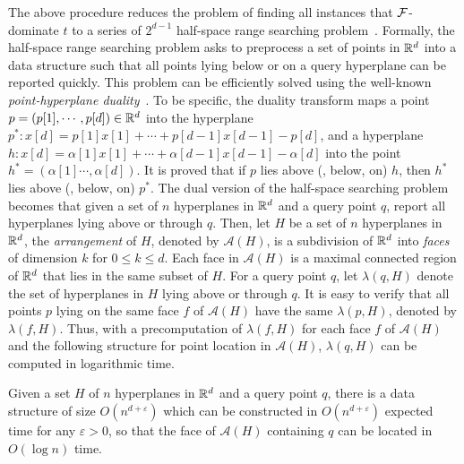 The above procedure reduces the problem of finding all instances that $\mathcal{F}$-dominate $t$ to a series of $2^{d-1}$ half-space range searching problem~\cite{agarwal2017simplex}.
Formally, the half-space range searching problem asks to preprocess a set of points in $\mathbb{R}^d$ into a data structure such that all points lying below or on a query hyperplane can be reported quickly.
This problem can be efficiently solved using the well-known \textit{point-hyperplane duality}~\cite{mark2008computational}.
To be specific, the duality transform maps a point $p = (p[1], \cdots, p[d]) \in \mathbb{R}^d$ into the hyperplane $p^* : x[d] = p[1]x[1] + \cdots + p[d-1]x[d-1] - p[d]$, and a hyperplane $h : x[d] = \alpha[1]x[1] + \cdots + \alpha[d-1]x[d-1] - \alpha[d]$ into the point $h^* = (\alpha[1] \cdots, \alpha[d])$.
It is proved that if $p$ lies above (\resp, below, on) $h$, then $h^*$ lies above (\resp, below, on) $p^*$.
The dual version of the half-space searching problem becomes that given a set of $n$ hyperplanes in $\mathbb{R}^d$ and a query point $q$, report all hyperplanes lying above or through $q$.
Then, let $H$ be a set of $n$ hyperplanes in $\mathbb{R}^d$, the {\it arrangement} of $H$, denoted by $\mathcal{A}(H)$, is a subdivision of $\mathbb{R}^d$ into {\it faces} of dimension $k$ for $0 \le k \le d$.
Each face in $\mathcal{A}(H)$ is a maximal connected region of $\mathbb{R}^d$ that lies in the same subset of $H$.
For a query point $q$, let $\lambda(q, H)$ denote the set of hyperplanes in $H$ lying above or through $q$.
It is easy to verify that all points $p$ lying on the same face $f$ of $\mathcal{A}(H)$ have the same $\lambda(p, H)$, denoted by $\lambda(f, H)$.
Thus, with a precomputation of $\lambda(f, H)$ for each face $f$ of $\mathcal{A}(H)$ and the following structure for point location in $\mathcal{A}(H)$, $\lambda(q, H)$ can be computed in logarithmic time.

\begin{theorem}
	Given a set $H$ of $n$ hyperplanes in $\mathbb{R}^d$ and a query point $q$, there is a data structure of size $O(n^{d + \varepsilon})$ which can be constructed in $O(n^{d+\varepsilon})$ expected time for any $\varepsilon > 0$, so that the face of $\mathcal{A}(H)$ containing $q$ can be located in $O(\log{n})$ time.
	\label{thm:fast-point-location}
\end{theorem}

